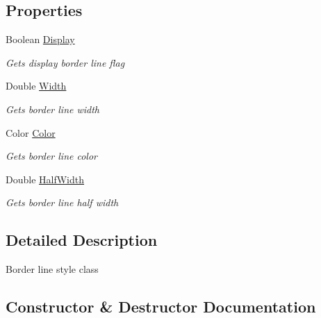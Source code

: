\subsection*{Properties}
\begin{DoxyCompactItemize}
\item 
Boolean \hyperlink{class_pdf_file_writer_1_1_pdf_table_border_style_a4ecbd8db28f20ef1a991aaba3742d38c}{Display}
\begin{DoxyCompactList}\small\item\em Gets display border line flag \end{DoxyCompactList}\item 
Double \hyperlink{class_pdf_file_writer_1_1_pdf_table_border_style_af23b07561b8fc98b8e654f29c2bc2161}{Width}
\begin{DoxyCompactList}\small\item\em Gets border line width \end{DoxyCompactList}\item 
Color \hyperlink{class_pdf_file_writer_1_1_pdf_table_border_style_a5b320d665ea45b78503c4990843faa9b}{Color}
\begin{DoxyCompactList}\small\item\em Gets border line color \end{DoxyCompactList}\item 
Double \hyperlink{class_pdf_file_writer_1_1_pdf_table_border_style_ac40033f1aef82163dbd2be65ae2afc2c}{Half\+Width}
\begin{DoxyCompactList}\small\item\em Gets border line half width \end{DoxyCompactList}\end{DoxyCompactItemize}


\subsection{Detailed Description}
Border line style class 



\subsection{Constructor \& Destructor Documentation}
